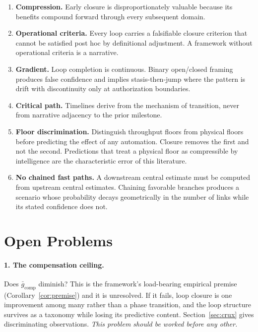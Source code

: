 \documentclass[11pt]{article}
\begin{document}
\begin{enumerate}[label=\textbf{P\arabic*.},leftmargin=3.2em]
\item \textbf{Compression.} Early closure is disproportionately valuable because its benefits compound forward through every subsequent domain.
\item \textbf{Operational criteria.} Every loop carries a falsifiable closure criterion that cannot be satisfied post hoc by definitional adjustment. A framework without operational criteria is a narrative.
\item \textbf{Gradient.} Loop completion is continuous. Binary open/closed framing produces false confidence and implies stasis-then-jump where the pattern is drift with discontinuity only at authorization boundaries.
\item \textbf{Critical path.} Timelines derive from the mechanism of transition, never from narrative adjacency to the prior milestone.
\item \textbf{Floor discrimination.} Distinguish throughput floors from physical floors before predicting the effect of any automation. Closure removes the first and not the second. Predictions that treat a physical floor as compressible by intelligence are the characteristic error of this literature.
\item \textbf{No chained fast paths.} A downstream central estimate must be computed from upstream central estimates. Chaining favorable branches produces a scenario whose probability decays geometrically in the number of links while its stated confidence does not.
\end{enumerate}

\section{Open Problems}
\label{sec:open}

\paragraph{1. The compensation ceiling.} Does $\bar{g}_{\mathrm{comp}}$ diminish? This is the framework's load-bearing empirical premise (Corollary~\ref{cor:premise}) and it is unresolved. If it fails, loop closure is one improvement among many rather than a phase transition, and the loop structure survives as a taxonomy while losing its predictive content. Section~\ref{sec:crux} gives discriminating observations. \emph{This problem should be worked before any other.}
\end{document}
